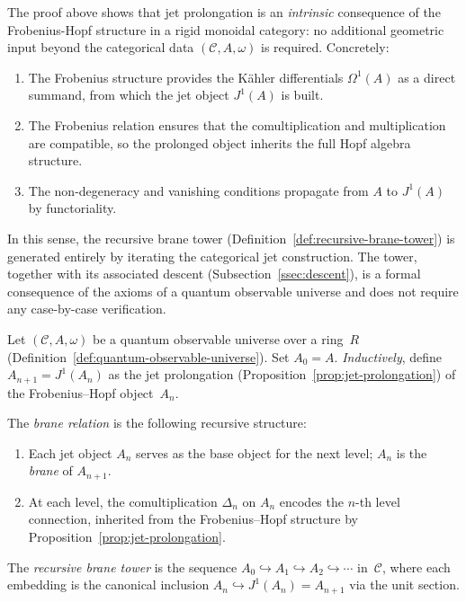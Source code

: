 \begin{remark}
\label{rem:prolongation-categorical}
The proof above shows that jet prolongation is an \emph{intrinsic}
consequence of the Frobenius-Hopf structure in a rigid monoidal category:
no additional geometric input beyond the categorical data
$(\mathcal{C}, A, \omega)$ is required.  Concretely:
\begin{enumerate}
  \item The Frobenius structure provides the K\"ahler differentials
        $\Omega^1(A)$ as a direct summand, from which the jet object
        $J^1(A)$ is built.
  \item The Frobenius relation ensures that the comultiplication and
        multiplication are compatible, so the prolonged object inherits
        the full Hopf algebra structure.
  \item The non-degeneracy and vanishing conditions propagate from $A$ to
        $J^1(A)$ by functoriality.
\end{enumerate}
In this sense, the recursive brane tower
(Definition~\ref{def:recursive-brane-tower}) is generated entirely by
iterating the categorical jet construction.  The tower, together with its
associated descent (Subsection~\ref{ssec:descent}), is a formal consequence
of the axioms of a quantum observable universe and does not require any
case-by-case verification.
\end{remark}


\begin{definition}
\label{def:recursive-brane-tower}
Let $(\mathcal{C}, A, \omega)$ be a quantum observable universe over a
ring~$R$ (Definition~\ref{def:quantum-observable-universe}).  Set
$A_0 = A$.  \emph{Inductively}, define
$A_{n+1} = J^1(A_n)$ as the jet prolongation
(Proposition~\ref{prop:jet-prolongation}) of the Frobenius--Hopf
object~$A_n$.

The \emph{brane relation} is the following recursive structure:
\begin{enumerate}
  \item Each jet object $A_n$ serves as the base object for the next level;
        $A_n$ is the \emph{brane} of $A_{n+1}$.
  \item At each level, the comultiplication $\Delta_n$ on $A_n$ encodes
        the $n$-th level connection, inherited from the Frobenius--Hopf
        structure by Proposition~\ref{prop:jet-prolongation}.
\end{enumerate}
The \emph{recursive brane tower} is the sequence
$A_0 \hookrightarrow A_1 \hookrightarrow A_2 \hookrightarrow \cdots$
in~$\mathcal{C}$, where each embedding is the canonical inclusion
$A_n \hookrightarrow J^1(A_n) = A_{n+1}$ via the unit section.
\end{definition}

